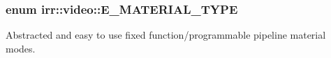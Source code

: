 \subsubsection[{\texorpdfstring{E\+\_\+\+M\+A\+T\+E\+R\+I\+A\+L\+\_\+\+T\+Y\+PE}{E\_MATERIAL\_TYPE}}]{\setlength{\rightskip}{0pt plus 5cm}enum {\bf irr\+::video\+::\+E\+\_\+\+M\+A\+T\+E\+R\+I\+A\+L\+\_\+\+T\+Y\+PE}}\hypertarget{namespaceirr_1_1video_ac8e9b6c66f7cebabd1a6d30cbc5430f1}{}\label{namespaceirr_1_1video_ac8e9b6c66f7cebabd1a6d30cbc5430f1}


Abstracted and easy to use fixed function/programmable pipeline material modes. 

